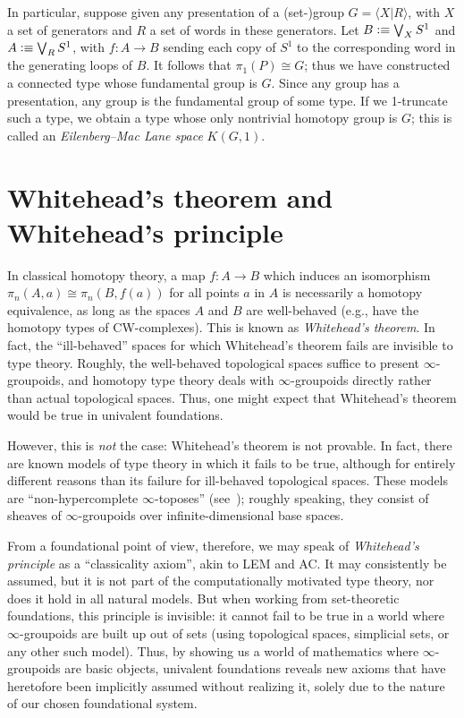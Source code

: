 \begin{eg}\label{eg:kg1}
  In particular, suppose given any presentation of a (set-)group $G = \langle X | R \rangle$, with $X$ a set of generators and $R$ a set of words in these generators.
  Let $B\vcentcolon\equiv \bigvee_X S^1$ and $A\vcentcolon\equiv \bigvee_R S^1$, with $f:A\to B$ sending each copy of $S^1$ to the corresponding word in the generating loops of $B$.
  It follows that $\pi_1(P) \cong G$; thus we have constructed a connected type whose fundamental group is $G$.
  Since any group has a presentation, any group is the fundamental group of some type.
  If we 1-truncate such a type, we obtain a type whose only nontrivial homotopy group is $G$; this is called an \emph{Eilenberg--Mac Lane space} $K(G,1)$.
\end{eg}


\section{Whitehead's theorem and Whitehead's principle}
\label{sec:whitehead}

In classical homotopy theory, a map $f:A\to B$ which induces an isomorphism $\pi_n(A,a) \cong \pi_n(B,f(a))$ for all points $a$ in $A$ is necessarily a homotopy equivalence, as long as the spaces $A$ and $B$ are well-behaved (e.g., have the homotopy types of CW-complexes).
This is known as \emph{Whitehead's theorem}.
In fact, the ``ill-behaved'' spaces for which Whitehead's theorem fails are invisible to type theory.
Roughly, the well-behaved topological spaces suffice to present $\infty$-groupoids, and homotopy type theory deals with $\infty$-groupoids directly rather than actual topological spaces.
Thus, one might expect that Whitehead's theorem would be true in univalent foundations.

However, this is \emph{not} the case: Whitehead's theorem is not provable.
In fact, there are known models of type theory in which it fails to be true, although for entirely different reasons than its failure for ill-behaved topological spaces.
These models are ``non-hypercomplete $\infty$-toposes'' (see~\cite{lurie:higher-topoi}); roughly speaking, they consist of sheaves of $\infty$-groupoids over infinite-dimensional base spaces.

From a foundational point of view, therefore, we may speak of \emph{Whitehead's principle} as a ``classicality axiom'', akin to LEM and AC.
It may consistently be assumed, but it is not part of the computationally motivated type theory, nor does it hold in all natural models.
But when working from set-theoretic foundations, this principle is invisible: it cannot fail to be true in a world where $\infty$-groupoids are built up out of sets (using topological spaces, simplicial sets, or any other such model).
Thus, by showing us a world of mathematics where $\infty$-groupoids are basic objects, univalent foundations reveals new axioms that have heretofore been implicitly assumed without realizing it, solely due to the nature of our chosen foundational system.

